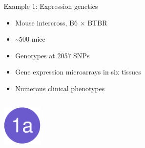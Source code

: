 \documentclass[final,plain]{beamer}
\newlength{\sepwid}
\newlength{\onecolwid}
\newlength{\twocolwid}
\newcommand{\bi}{\begin{itemize}}
\newcommand{\ei}{\end{itemize}}
\begin{document}
\begin{frame}[t]
\begin{columns}[t]
\begin{column}{\onecolwid}
  \end{column}

\begin{column}{\sepwid} \end{column}                 %

  \begin{column}{\twocolwid}
    \begin{exampleblock}{\Large Example 1: Expression genetics}{
    \begin{center}
    \begin{minipage}[t]{0.6\onecolwid}
    \vspace*{0mm}

    \bi
    \item Mouse intercross, B6 $\times$ BTBR
    \item {\textasciitilde}500 mice
    \item Genotypes at 2057 SNPs
    \ei

    \end{minipage}
    \hspace{0.5\sepwid}
    \begin{minipage}[t]{0.7\onecolwid}
    \vspace*{0mm}

    \bi
    \item Gene expression microarrays in six tissues
    \item Numerous clinical phenotypes
    \ei

    \end{minipage} \end{center}
    }
    \end{exampleblock}

    \vspace{1mm} %

    \begin{columns}[t]

      \begin{column}{\onecolwid}

        \href{http://www.biostat.wisc.edu/~kbroman/posters/ENAR2014/1a}{\includegraphics[width=2cm]{Figs/dot1a.pdf}}


\end{column}
\end{columns}
\end{column}
\end{columns}
\end{frame}
\end{document}

